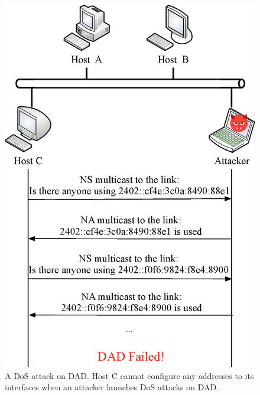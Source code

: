 \documentclass[journal]{IEEEtran}
\begin{document}
        \begin{figure}
        \centerline{
            \includegraphics[scale=0.50]{figure/DAD-DoS.eps}
        }
        \caption{A DoS attack on DAD. Host C cannot configure any addresses to its interfaces when an attacker launches DoS attacks on DAD.}
        \label{fig:DoS-Attack-on-DAD}
        \end{figure}
\end{document}
